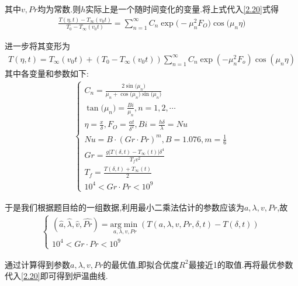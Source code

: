 \documentclass[../main.tex]{subfiles}
\begin{document}
    \par  其中$v,Pr$均为常数.则$h$实际上是一个随时间变化的变量.将上式代入\eqref{2.20}式得
    \begin{align}\label{3.6}
    \frac{T(\eta ,t)-T_{\infty}\left( v_0t \right)}{T_0-T_{\infty}\left( v_0t \right)}=\sum_{n=1}^{\infty}{C_n\exp\mathrm{(}-\mu _{n}^{2}F_O)\cos\mathrm{(}\mu _n\eta )}
    \end{align}
    \par 进一步将其变形为 
    \begin{align}\label{3.7}
        T(\eta, t) = T_\infty(v_0 t) + (T_0 - T_\infty(v_0 t)) \sum_{n = 1}^{\infty} C_n \exp(-\mu_n^2 F_o) \cos(\mu_n \eta)
    \end{align}
      其中各变量和参数如下:
    \begin{align}\label{4.4}
        \left\{\begin{array}{l}
    C_n=\frac{2\sin\mathrm{(}\mu _n)}{\mu _n+\cos\mathrm{(}\mu _n)\sin\mathrm{(}\mu _n)}
    \\
    \tan\mathrm{(}\mu _n)=\frac{Bi}{\mu _n},n=1,2,\cdots 
    \\
    \eta =\frac{x}{\delta},F_O=\frac{at}{\delta ^2},Bi=\frac{h\delta}{\lambda}=Nu
    \\
    Nu=B \cdot \left( Gr\cdot Pr \right) ^{m},B=1.076,m=\frac{1}{6}
    \\
    Gr=\frac{g\left| T\left( \delta,t \right) -T_{\infty}\left( t \right) \right|\delta ^4}{T_fv^2}
    \\
    T_f=\frac{T\left( \delta,t \right) +T_{\infty}\left( t \right)}{2}
    \\
    10^4<Gr\cdot Pr<10^9
    \end{array} \right.
    \end{align}
    \par 于是我们根据题目给的一组数据,利用最小二乘法估计的参数应该为$a,\lambda,v,Pr$,故
    \begin{align}\label{4.5}
        \left\{\begin{array}{l}
    \left( \widehat{a},\widehat{\lambda },\widehat{v},\widehat{Pr} \right) =\underset{a,\lambda ,v,Pr}{\mathrm{arg}\min}\left( T\left( a,\lambda ,v,Pr,\delta,t \right) -T\left( \delta,t \right) \right) 
    \\
    10^4<Gr\cdot Pr<10^9
    \end{array} \right.
    \end{align}
    \par 通过计算得到参数$a,\lambda,v,Pr$的最优值,即拟合优度$R^2$最接近1的取值.再将最优参数代入\eqref{2.20}即可得到炉温曲线.
    
\end{document}
